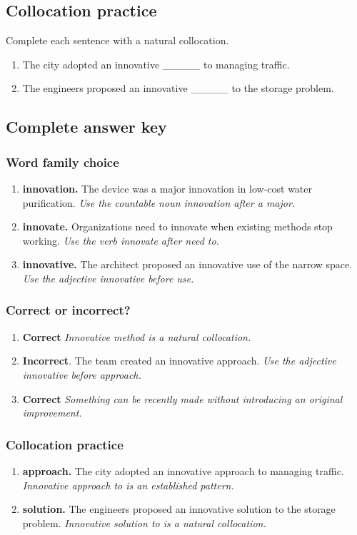 \documentclass[11pt]{article}
\begin{document}
\subsection{Collocation practice}
Complete each sentence with a natural collocation.

\begin{enumerate}
  \item The city adopted an innovative \_\_\_\_\_ to managing traffic.
  \item The engineers proposed an innovative \_\_\_\_\_ to the storage problem.
\end{enumerate}

\subsection{Complete answer key}
\subsubsection{Word family choice}
\begin{enumerate}
  \item \textbf{innovation.} The device was a major innovation in low-cost water purification. \emph{Use the countable noun innovation after a major.}
  \item \textbf{innovate.} Organizations need to innovate when existing methods stop working. \emph{Use the verb innovate after need to.}
  \item \textbf{innovative.} The architect proposed an innovative use of the narrow space. \emph{Use the adjective innovative before use.}
\end{enumerate}

\subsubsection{Correct or incorrect?}
\begin{enumerate}
  \item \textbf{Correct} \emph{Innovative method is a natural collocation.}
  \item \textbf{Incorrect}. The team created an innovative approach. \emph{Use the adjective innovative before approach.}
  \item \textbf{Correct} \emph{Something can be recently made without introducing an original improvement.}
\end{enumerate}

\subsubsection{Collocation practice}
\begin{enumerate}
  \item \textbf{approach.} The city adopted an innovative approach to managing traffic. \emph{Innovative approach to is an established pattern.}
  \item \textbf{solution.} The engineers proposed an innovative solution to the storage problem. \emph{Innovative solution to is a natural collocation.}
\end{enumerate}
\end{document}
